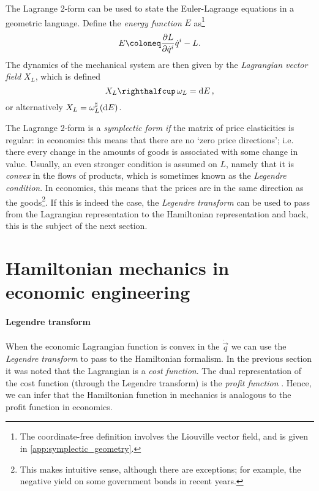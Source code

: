 The Lagrange 2-form can be used to state the Euler-Lagrange equations in a geometric language. Define the \emph{energy function} $E$ as\footnote{The coordinate-free definition involves the Liouville vector field, and is given in \cref{app:symplectic_geometry}.}
\begin{equation}
    E \coloneq \pdv{L}{\dot{q}^i}\dot{q}^i - L.
\end{equation}
The dynamics of the mechanical system are then given by the \emph{Lagrangian vector field} $X_L$, which is defined 
\begin{equation}
    \intpr{X_L}{\omega_L} = \dd{E}, 
\end{equation}
or alternatively $X_L = \omega_L^\sharp(\dd{E})$.

The Lagrange 2-form is a \emph{symplectic form} \emph{if} the matrix of price elasticities is regular: in economics this means that there are no `zero price directions'; i.e. there every change in the amounts of goods is associated with some change in value. Usually, an even stronger condition is assumed on $L$, namely that it is \emph{convex} in the flows of products, which is sometimes known as the \emph{Legendre condition}. In economics, this means that the prices are in the same direction as the goods\footnote{This makes intuitive sense, although there are exceptions; for example, the negative yield on some government bonds in recent years.}. If this is indeed the case, the \emph{Legendre transform} can be used to pass from the Lagrangian representation to the Hamiltonian representation and back, this is the subject of the next section. 

\section{Hamiltonian mechanics in economic engineering}
\paragraph{Legendre transform} 
When the economic Lagrangian function is convex in the $\dot{\vec{q}}$ we can use the \emph{Legendre transform} to pass to the Hamiltonian formalism. In the previous section it was noted that the Lagrangian is a \emph{cost function}. The dual representation of the cost function (through the Legendre transform) is the \emph{profit function} \cite{blume2020,varianhalr1992}. Hence, we can infer that the Hamiltonian function in mechanics is analogous to the profit function in economics. 

